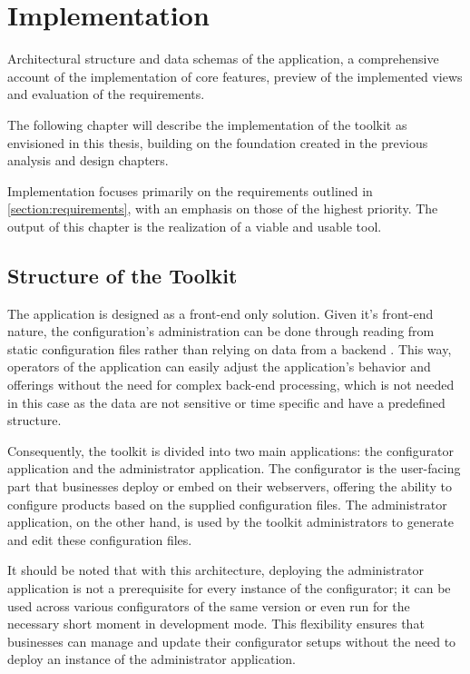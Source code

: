 \chapter{Implementation}

\begin{chapterabstract}
    Architectural structure and data schemas of the application, a comprehensive account of the implementation of core features, preview of the implemented views and evaluation of the requirements.
\end{chapterabstract}

The following chapter will describe the implementation of the toolkit as envisioned in this thesis, building on the foundation created in the previous analysis and design chapters. 

Implementation focuses primarily on the requirements outlined in \autoref{section:requirements}, with an emphasis on those of the highest priority. The output of this chapter is the realization of a viable and usable tool.

\section{Structure of the Toolkit}

The application is designed as a front-end only solution. Given it's front-end nature, the configuration's administration can be done through reading from static configuration files rather than relying on data from a backend . This way, operators of the application can easily adjust the application's behavior and offerings without the need for complex back-end processing, which is not needed in this case as the data are not sensitive or time specific and have a predefined structure. 

Consequently, the toolkit is divided into two main applications: the configurator application and the administrator application. The configurator is the user-facing part that businesses deploy or embed on their webservers, offering the ability to configure products based on the supplied configuration files. The administrator application, on the other hand, is used by the toolkit administrators to generate and edit these configuration files.

It should be noted that with this architecture, deploying the administrator application is not a prerequisite for every instance of the configurator; it can be used across various configurators of the same version or even run for the necessary short moment in development mode. This flexibility ensures that businesses can manage and update their configurator setups without the need to deploy an instance of the administrator application.

